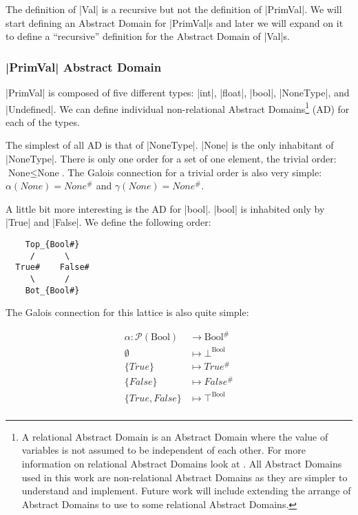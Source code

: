 The definition of \pycode|Val| is a recursive but not the definition of
\pycode|PrimVal|. We will start defining an Abstract Domain for
\pycode|PrimVal|s and later we will expand on it to define a
\enquote{recursive} definition for the Abstract Domain of \pycode|Val|s.

\subsubsection*{\texorpdfstring{\pycode|PrimVal| Abstract
Domain}{PrimVal Abstract Domain}}\label{primval-abstract-domain}

\pycode|PrimVal| is composed of five different types: \pycode|int|,
\pycode|float|, \pycode|bool|, \pycode|NoneType|, and
\pycode|Undefined|. We can define individual non-relational Abstract
Domains\footnote{A relational Abstract Domain is an Abstract Domain
  where the value of variables is not assumed to be independent of each
  other. For more information on relational Abstract Domains look at
  \textcite{mine_weakly_2004}. All Abstract Domains used
  in this work are non-relational Abstract Domains as they are simpler
  to understand and implement. Future work will include extending the
  arrange of Abstract Domains to use to some relational Abstract Domains.}
(AD) for each of the types.

The simplest of all AD is that of \pycode|NoneType|. \pycode|None| is
the only inhabitant of \pycode|NoneType|. There is only one order for a
set of one element, the trivial order: \(\text{None} \le \text{None}\).
The Galois connection for a trivial order is also very simple:
\(\alpha(None) = None^{\#}\) and \(\gamma(None) = None^{\#}\).

A little bit more interesting is the AD for \pycode|bool|. \pycode|bool|
is inhabited only by \pycode|True| and \pycode|False|. We define the
following order:


\begin{verbatim}
    Top_{Bool#}
     /      \
  True#    False#
     \      /
    Bot_{Bool#}
\end{verbatim}

The Galois connection for this lattice is also quite simple:

\begin{align*}
  \alpha \colon \mathcal{P}(\text{Bool}) &\to \text{Bool}^{\#} \\
  \emptyset &\mapsto \bot^{\text{Bool}} \\
  \{True\} &\mapsto True^{\#} \\
  \{False\} &\mapsto False^{\#} \\
  \{True,False\} &\mapsto \top^{\text{Bool}} \\
\end{align*}

